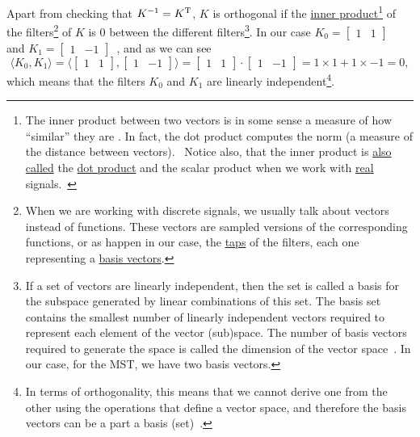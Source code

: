 Apart from checking that $K^{-1}=K^{\text T}$, $K$ is orthogonal if
the \href{https://en.wikipedia.org/wiki/Inner_product_space}{inner
  product}\footnote{The inner product between two vectors is in some
  sense a measure of how ``similar'' they are
  \cite{sayood2017introduction}. In fact, the dot product computes the
  norm (a measure of the distance between
  vectors).~\cite{vetterli2014foundations} Notice also, that the inner
  product is
  \href{https://math.stackexchange.com/questions/476738/difference-between-dot-product-and-inner-product}{also
    called} the \href{https://en.wikipedia.org/wiki/Dot_product}{dot
    product} and the scalar product when we work with
  \href{https://en.wikipedia.org/wiki/Real_number}{real}
  signals.~\cite{vetterli2014foundations}} of the
filters\footnote{When we are working with discrete signals, we usually
  talk about vectors instead of functions. These vectors are sampled
  versions of the corresponding functions, or as happen in our case,
  the
  \href{https://en.wikipedia.org/wiki/Finite_impulse_response}{taps}
  of the filters, each one representing a
  \href{https://en.wikipedia.org/wiki/Basis_(linear_algebra)}{basis
    vectors}.} of $K$ is $0$ between the different filters\footnote{If
  a set of vectors are linearly independent, then the set is called a
  basis for the subspace generated by linear combinations of this
  set. The basis set contains the smallest number of linearly
  independent vectors required to represent each element of the vector
  (sub)space. The number of basis vectors required to generate the
  space is called the dimension of the vector
  space~\cite{sayood2017introduction}. In our case, for the MST, we
  have two basis vectors.}. In our case
$K_0=\begin{bmatrix}1 & 1\end{bmatrix}$~ and
$K_1=\begin{bmatrix} 1 & -1\end{bmatrix}$~, and as we can see
\begin{equation}
  \langle K_0,K_1 \rangle =
  \langle \begin{bmatrix}
    1 & 1
  \end{bmatrix}
  ,
  \begin{bmatrix}
    1 & -1
  \end{bmatrix}
  \rangle =
  \begin{bmatrix}
    1 & 1
  \end{bmatrix}
  \cdot
  \begin{bmatrix}
    1 & -1
  \end{bmatrix}
   = 1\times 1 + 1\times -1 = 0,
\end{equation}
which means that the filters $K_0$ and $K_1$ are linearly
independent\footnote{In terms of orthogonality, this means that we
  cannot derive one from the other using the operations that define a
  vector space, and therefore the basis vectors can be a part a basis
  (set)~\cite{strang4linear}.}.

